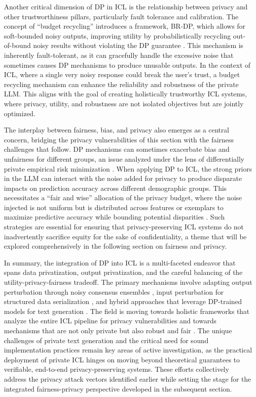 \documentclass[11pt]{article}
\begin{document}
Another critical dimension of DP in ICL is the relationship between privacy and other trustworthiness pillars, particularly fault tolerance and calibration. The concept of ``budget recycling'' introduces a framework, BR-DP, which allows for soft-bounded noisy outputs, improving utility by probabilistically recycling out-of-bound noisy results without violating the DP guarantee \cite{ref461}. This mechanism is inherently fault-tolerant, as it can gracefully handle the excessive noise that sometimes causes DP mechanisms to produce unusable outputs. In the context of ICL, where a single very noisy response could break the user's trust, a budget recycling mechanism can enhance the reliability and robustness of the private LLM. This aligns with the goal of creating holistically trustworthy ICL systems, where privacy, utility, and robustness are not isolated objectives but are jointly optimized.

The interplay between fairness, bias, and privacy also emerges as a central concern, bridging the privacy vulnerabilities of this section with the fairness challenges that follow. DP mechanisms can sometimes exacerbate bias and unfairness for different groups, an issue analyzed under the lens of differentially private empirical risk minimization \cite{ref462}. When applying DP to ICL, the strong priors in the LLM can interact with the noise added for privacy to produce disparate impacts on prediction accuracy across different demographic groups. This necessitates a ``fair and wise'' allocation of the privacy budget, where the noise injected is not uniform but is distributed across features or exemplars to maximize predictive accuracy while bounding potential disparities \cite{ref463}. Such strategies are essential for ensuring that privacy-preserving ICL systems do not inadvertently sacrifice equity for the sake of confidentiality, a theme that will be explored comprehensively in the following section on fairness and privacy.

In summary, the integration of DP into ICL is a multi-faceted endeavor that spans data privatization, output privatization, and the careful balancing of the utility-privacy-fairness tradeoff. The primary mechanisms involve adapting output perturbation through noisy consensus ensembles \cite{ref454}, input perturbation for structured data serialization \cite{ref455}, and hybrid approaches that leverage DP-trained models for text generation \cite{ref458}. The field is moving towards holistic frameworks that analyze the entire ICL pipeline for privacy vulnerabilities \cite{ref456} and towards mechanisms that are not only private but also robust and fair \cite{ref461,ref463}. The unique challenges of private text generation and the critical need for sound implementation practices remain key areas of active investigation, as the practical deployment of private ICL hinges on moving beyond theoretical guarantees to verifiable, end-to-end privacy-preserving systems. These efforts collectively address the privacy attack vectors identified earlier while setting the stage for the integrated fairness-privacy perspective developed in the subsequent section.
\end{document}
